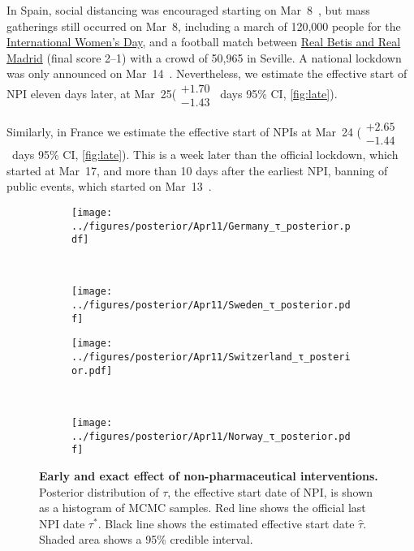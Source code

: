 \documentclass[12pt]{extarticle}
\begin{document}
In Spain, social distancing was encouraged starting on Mar~8~\citep{Flaxman2020}, but mass gatherings still occurred on Mar~8, including a march of 120,000 people for the \href{https://www.nytimes.com/2020/03/13/world/europe/spain-coronavirus-emergency.html}{International Women's Day}, and a football match between \href{https://www.espn.com/soccer/match?gameId=550350}{Real Betis and Real Madrid} (final score 2--1) with a crowd of 50,965 in Seville.
A national lockdown was only announced on Mar~14~\citep{Flaxman2020}.
Nevertheless, we estimate the effective start of NPI eleven days later, at Mar~25($\substack{+1.70 \\ -1.43}$~days 95\% CI, \autoref{fig:late}).

Similarly, in France we estimate the effective start of NPIs at Mar~24 ($\substack{+2.65 \\ -1.44}$~days 95\% CI, \autoref{fig:late}).
This is a week later than the official lockdown, which started at Mar~17, and more than 10 days after the earliest NPI, banning of public events, which started on Mar~13~\citep{Flaxman2020}.



\begin{figure}[h]
    \centering
    \begin{subfigure}{0.45\textwidth}
        \texttt{[image: ../figures/posterior/Apr11/Germany\_τ\_posterior.pdf]}
    \end{subfigure}
    ~
    \begin{subfigure}{0.45\textwidth}
		\texttt{[image: ../figures/posterior/Apr11/Sweden\_τ\_posterior.pdf]}
    \end{subfigure}
    
	\begin{subfigure}{0.45\textwidth}
        \texttt{[image: ../figures/posterior/Apr11/Switzerland\_τ\_posterior.pdf]}
    \end{subfigure}
    ~
    \begin{subfigure}{0.45\textwidth}
		\texttt{[image: ../figures/posterior/Apr11/Norway\_τ\_posterior.pdf]}
    \end{subfigure}
    \caption{
    \textbf{Early and exact effect of non-pharmaceutical interventions.}
    Posterior distribution of $\tau$, the effective start date of NPI, is shown as a histogram of MCMC samples. Red line shows the official last NPI date $\tau^*$. Black line shows the estimated effective start date $\hat{\tau}$. Shaded area shows a 95\% credible interval. 
	}
	\label{fig:early}
\end{figure}
\end{document}
